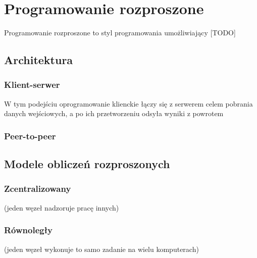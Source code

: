 
\chapter{Programowanie rozproszone}
\label{cha:programowanieRozproszone}
Programowanie rozproszone to styl programowania umożliwiający [TODO]
\section{Architektura}
\label{sec:architektura}

\subsection{Klient-serwer}
\label{ssec:klientSerwer}
W tym podejściu oprogramowanie klienckie łączy się z serwerem celem pobrania danych wejściowych, a po ich przetworzeniu odsyła wyniki z powrotem

\subsection{Peer-to-peer}
\label{ssec:peer2peer}


\section{Modele obliczeń rozproszonych}
\label{sec:modeleObl}

\subsection{Zcentralizowany}
\label{ssec:zcentralizowany}
(jeden węzeł nadzoruje pracę innych)

\subsection{Równoległy}
\label{ssec:rownolegly}
(jeden węzeł wykonuje to samo zadanie na wielu komputerach)